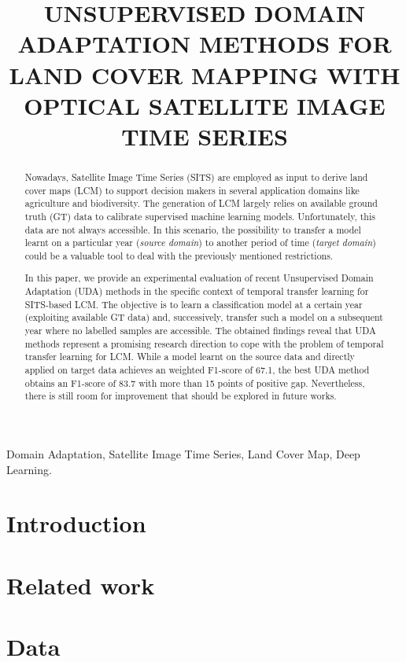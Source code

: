 \documentclass{article}
\title{UNSUPERVISED DOMAIN ADAPTATION METHODS FOR LAND COVER MAPPING WITH OPTICAL SATELLITE IMAGE TIME SERIES}
\begin{document}
%
\maketitle
%
\begin{abstract}
Nowadays, Satellite Image Time Series (SITS) are employed as input to derive land cover maps (LCM) to support decision makers in several application domains like agriculture and biodiversity. The generation of LCM largely relies on available ground truth (GT) data to calibrate supervised machine learning models. Unfortunately, this data are not always accessible. In this scenario, the possibility to transfer a model learnt on a particular year (\textit{source domain}) to another period of time (\textit{target domain}) could be a valuable tool to deal with the previously mentioned restrictions.

In this paper, we provide an experimental evaluation of recent Unsupervised Domain Adaptation (UDA) methods in the specific context of temporal transfer learning for SITS-based LCM. The objective is to learn a classification model at a certain year (exploiting available GT data) and, successively, transfer such a model on a subsequent year where no labelled samples are accessible. The obtained findings reveal that UDA methods represent a promising research direction to cope with the problem of temporal transfer learning for LCM. While a model learnt on the source data and directly applied on target data achieves an weighted F1-score of 67.1, the best UDA method obtains an F1-score of 83.7 with more than 15 points of positive gap. Nevertheless, there is still room for improvement that should be explored in future works.
\end{abstract}
%
\begin{keywords}
Domain Adaptation, Satellite Image Time Series, Land Cover Map, Deep Learning.
\end{keywords}
%
\section{Introduction}
\label{sec:intro}


\section{Related work}
\label{sec:relatedwork}


\section{Data}
\label{sec:data}

\end{document}

